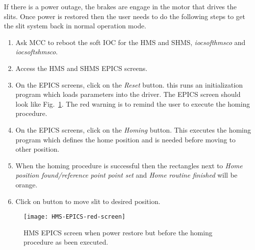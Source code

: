If there is a power outage, the brakes are engage in the motor that drives the slits. Once power is restored then the user needs to do the
following steps to get the slit system back in normal operation mode.
\begin{enumerate}
\item Ask MCC to reboot the soft IOC for the HMS and SHMS, {\it  iocsofthmsco} and {\it iocsoftshmsco}.
\item Access the HMS and SHMS EPICS screens.
\item On the EPICS screens, click on the {\it Reset} button. this runs an initialization program which loads parameters into the driver. The EPICS screen should look like Fig.~\ref{fig:red-screen-epics}. The red warning is to remind the user to execute the homing procedure.
\item On the EPICS screens, click on the {\it Homing} button. This executes the homing program which defines the home position and is needed before moving to other position.
\item When the homing procedure is successful then the rectangles next to {\it Home position found/reference point point set} and {\it Home routine finished} will be orange.
\item Click on button to move slit to desired position.
\end{enumerate}
\begin{figure}
\texttt{[image: HMS-EPICS-red-screen]}
\caption{HMS EPICS screen when power restore but before the homing procedure as been executed. \label{fig:red-screen-epics}}
\end{figure}








